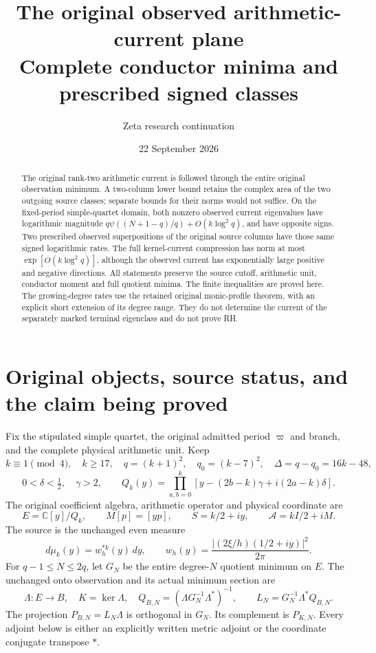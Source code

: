 \documentclass[11pt]{article}
\title{The original observed arithmetic-current plane\\Complete conductor minima and prescribed signed classes}
\author{Zeta research continuation}
\date{22 September 2026}
\newcommand{\C}{\mathbb C}
\begin{document}
\maketitle
\begin{abstract}
The original rank-two arithmetic current is followed through the entire original observation minimum. A two-column lower bound retains the complex area of the two outgoing source classes; separate bounds for their norms would not suffice. On the fixed-period simple-quartet domain, both nonzero observed current eigenvalues have logarithmic magnitude $q\psi((N+1-q)/q)+O(k\log^2q)$, and have opposite signs. Two prescribed observed superpositions of the original source columns have those same signed logarithmic rates. The full kernel-current compression has norm at most $\exp[O(k\log^2q)]$, although the observed current has exponentially large positive and negative directions. All statements preserve the source cutoff, arithmetic unit, conductor moment and full quotient minima. The finite inequalities are proved here. The growing-degree rates use the retained original monic-profile theorem, with an explicit short extension of its degree range. They do not determine the current of the separately marked terminal eigenclass and do not prove RH.
\end{abstract}
\tableofcontents

\section{Original objects, source status, and the claim being proved}
Fix the stipulated simple quartet, the original admitted period $\varpi$ and branch, and the complete physical arithmetic unit. Keep
\[
 k\equiv1\pmod4,\quad k\ge17,\quad q=(k+1)^2,\quad q_0=(k-7)^2,
 \quad\Delta=q-q_0=16k-48,
\]
\[
 0<\delta<\tfrac12,\quad\gamma>2,\qquad
 Q_k(y)=\prod_{a,b=0}^k[y-(2b-k)\gamma+i(2a-k)\delta].
\]
The original coefficient algebra, arithmetic operator and physical coordinate are
\[
 E=\C[y]/Q_k,\qquad M[p]=[yp],\qquad
 S=k/2+iy,\qquad \mathscr A=kI/2+iM.
\]
The source is the unchanged even measure
\[
 d\mu_k(y)=w_h^{*k}(y)\,dy,\qquad
 w_h(y)=\frac{|(2\xi/h)(1/2+iy)|^2}{2\pi}.
\]
For $q-1\le N\le2q$, let $G_N$ be the entire degree-$N$ quotient minimum on $E$. The unchanged onto observation and its actual minimum section are
\[
 \Lambda:E\to B,\quad K=\ker\Lambda,\quad
 Q_{B,N}=(\Lambda G_N^{-1}\Lambda^*)^{-1},\qquad
 L_N=G_N^{-1}\Lambda^*Q_{B,N}.
 \tag{OCP1}
\]
The projection $P_{B,N}=L_N\Lambda$ is orthogonal in $G_N$. Its complement is $P_{K,N}$. Every adjoint below is either an explicitly written metric adjoint or the coordinate conjugate transpose $*$.
\end{document}
